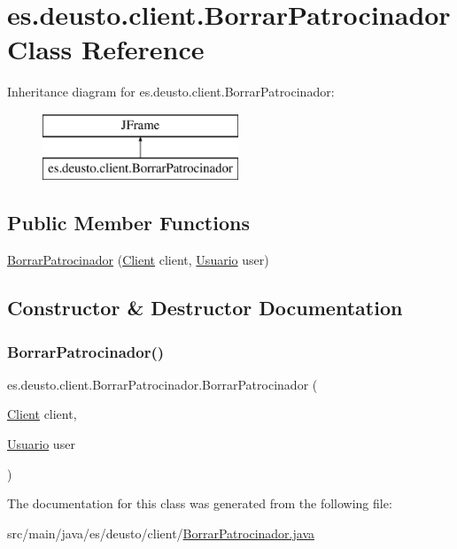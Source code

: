 \hypertarget{classes_1_1deusto_1_1client_1_1_borrar_patrocinador}{}\section{es.\+deusto.\+client.\+Borrar\+Patrocinador Class Reference}
\label{classes_1_1deusto_1_1client_1_1_borrar_patrocinador}
Inheritance diagram for es.\+deusto.\+client.\+Borrar\+Patrocinador\+:\begin{figure}[H]
\begin{center}
\leavevmode
\includegraphics[height=2.000000cm]{classes_1_1deusto_1_1client_1_1_borrar_patrocinador}
\end{center}
\end{figure}
\subsection*{Public Member Functions}
\begin{DoxyCompactItemize}
\item 
\mbox{\hyperlink{classes_1_1deusto_1_1client_1_1_borrar_patrocinador_a548f7d483b83e58660b9ed0c0aa2dac2}{Borrar\+Patrocinador}} (\mbox{\hyperlink{classes_1_1deusto_1_1client_1_1_client}{Client}} client, \mbox{\hyperlink{classes_1_1deusto_1_1server_1_1jdo_1_1_usuario}{Usuario}} user)
\end{DoxyCompactItemize}


\subsection{Constructor \& Destructor Documentation}
\mbox{\label{classes_1_1deusto_1_1client_1_1_borrar_patrocinador_a548f7d483b83e58660b9ed0c0aa2dac2}} 
\subsubsection{\texorpdfstring{BorrarPatrocinador()}{BorrarPatrocinador()}}
{\footnotesize\ttfamily es.\+deusto.\+client.\+Borrar\+Patrocinador.\+Borrar\+Patrocinador (\begin{DoxyParamCaption}\item[{\mbox{\hyperlink{classes_1_1deusto_1_1client_1_1_client}{Client}}}]{client,  }\item[{\mbox{\hyperlink{classes_1_1deusto_1_1server_1_1jdo_1_1_usuario}{Usuario}}}]{user }\end{DoxyParamCaption})}



The documentation for this class was generated from the following file\+:\begin{DoxyCompactItemize}
\item 
src/main/java/es/deusto/client/\mbox{\hyperlink{_borrar_patrocinador_8java}{Borrar\+Patrocinador.\+java}}\end{DoxyCompactItemize}

